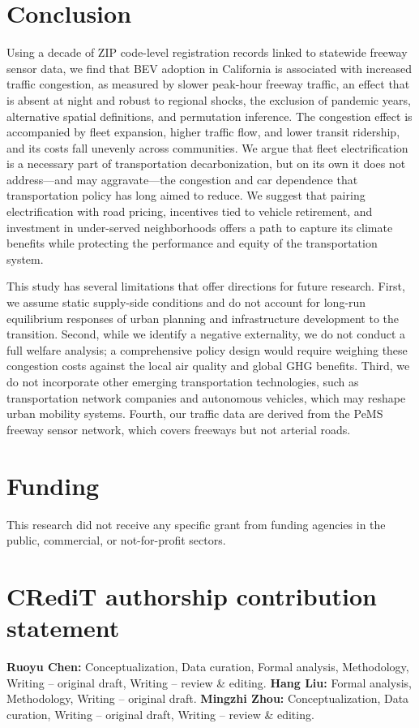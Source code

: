 \documentclass[11pt, letterpaper]{article}
\begin{document}
\section{Conclusion}\label{sec:conclusion}
Using a decade of ZIP code-level registration records linked to statewide freeway sensor data, we find that BEV adoption in California is associated with increased traffic congestion, as measured by slower peak-hour freeway traffic, an effect that is absent at night and robust to regional shocks, the exclusion of pandemic years, alternative spatial definitions, and permutation inference.
The congestion effect is accompanied by fleet expansion, higher traffic flow, and lower transit ridership, and its costs fall unevenly across communities.
We argue that fleet electrification is a necessary part of transportation decarbonization, but on its own it does not address---and may aggravate---the congestion and car dependence that transportation policy has long aimed to reduce.
We suggest that pairing electrification with road pricing, incentives tied to vehicle retirement, and investment in under-served neighborhoods offers a path to capture its climate benefits while protecting the performance and equity of the transportation system.

This study has several limitations that offer directions for future research.
First, we assume static supply-side conditions and do not account for long-run equilibrium responses of urban planning and infrastructure development to the transition.
Second, while we identify a negative externality, we do not conduct a full welfare analysis; a comprehensive policy design would require weighing these congestion costs against the local air quality and global GHG benefits.
Third, we do not incorporate other emerging transportation technologies, such as transportation network companies and autonomous vehicles, which may reshape urban mobility systems.
Fourth, our traffic data are derived from the PeMS freeway sensor network, which covers freeways but not arterial roads.

\newpage
\section*{Funding}
\noindent
This research did not receive any specific grant from funding agencies in the public, commercial, or not-for-profit sectors.

\section*{CRediT authorship contribution statement}
\noindent
\textbf{Ruoyu Chen:} Conceptualization, Data curation, Formal analysis, Methodology, Writing -- original draft, Writing -- review \& editing.
\textbf{Hang Liu:} Formal analysis, Methodology, Writing -- original draft.
\textbf{Mingzhi Zhou:} Conceptualization, Data curation, Writing -- original draft, Writing -- review \& editing.
\end{document}
